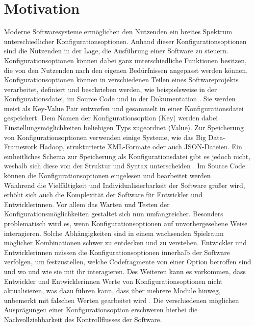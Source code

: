 \documentclass[german,bachelor]{swsLeipzig}
\begin{document}
\section{Motivation}
Moderne Softwaresysteme ermöglichen den Nutzenden ein breites Spektrum unterschiedlicher Konfigurationsoptionen.
Anhand dieser Konfigurationsoptionen sind die Nutzenden in der Lage, die Ausführung einer Software zu steuern.
Konfigurationsoptionen können dabei ganz unterschiedliche Funktionen besitzen, die von den Nutzenden nach den eigenen Bedürfnissen angepasst werden können.\\
\indent Konfigurationsoptionen können in verschiedenen Teilen eines Softwareprojekts verarbeitet, definiert und beschrieben werden,
wie beispielsweise in der Konfigurationsdatei, im Source Code und in der Dokumentation \cite[]{7774519}.
Sie werden meist als Key-Value Pair entworfen und gesammelt in einer Konfigurationsdatei gespeichert.
Dem Namen der Konfigurationsoption (Key) werden dabei Einstellungsmöglichkeiten beliebigen Typs zugeordnet (Value).
Zur Speicherung von Konfigurationsoptionen verwenden einige Systeme, wie das Big Data-Framework Hadoop, strukturierte XML-Formate oder auch JSON-Dateien.
Ein einheitliches Schema zur Speicherung als Konfigurationsdatei gibt es jedoch nicht, weshalb sich diese von der Struktur und Syntax unterscheiden \cite[]{10.1145/1985793.1985812}.
Im Source Code können die Konfigurationsoptionen eingelesen und bearbeitet werden \cite[]{7774519}.\\
\indent Wäahrend die Vielfältigkeit und Individualisierbarkeit der Software größer wird, erhöht sich auch die Komplexität der Software für Entwickler und Entwicklerinnen.
Vor allem das Warten und Testen der Konfigurationsmöglichkeiten gestaltet sich nun umfangreicher.
Besonders problematisch wird es, wenn Konfigurationsoptionen auf unvorhergesehene Weise interagieren.
Solche Abhängigkeiten sind in einem wachsenden Spielraum möglicher Kombinationen schwer zu entdecken und zu verstehen.
Entwickler und Entwicklerinnen müssen die Konfigurationsoptionen innerhalb der Software verfolgen, um festzustellen,
welche Codefragmente von einer Option betroffen sind und wo und wie sie mit ihr interagieren.
Des Weiteren kann es vorkommen, dass Entwickler und Entwicklerinnen Werte von Konfigurationsoptionen nicht aktualisieren, was dazu führen kann,
dass über mehrere Module hinweg, unbemerkt mit falschen Werten gearbeitet wird \cite[]{7774519}.
Die verschiedenen möglichen Ausprägungen einer Konfigurationsoption erschweren hierbei die Nachvollziehbarkeit des Kontrollflusses der Software.\\
\end{document}
